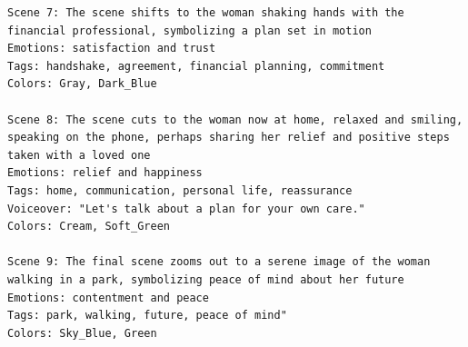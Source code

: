 \begin{lstlisting}
Scene 7: The scene shifts to the woman shaking hands with the financial professional, symbolizing a plan set in motion
Emotions: satisfaction and trust
Tags: handshake, agreement, financial planning, commitment
Colors: Gray, Dark_Blue

Scene 8: The scene cuts to the woman now at home, relaxed and smiling, speaking on the phone, perhaps sharing her relief and positive steps taken with a loved one
Emotions: relief and happiness
Tags: home, communication, personal life, reassurance
Voiceover: "Let's talk about a plan for your own care."
Colors: Cream, Soft_Green

Scene 9: The final scene zooms out to a serene image of the woman walking in a park, symbolizing peace of mind about her future
Emotions: contentment and peace
Tags: park, walking, future, peace of mind"
Colors: Sky_Blue, Green
\end{lstlisting}





